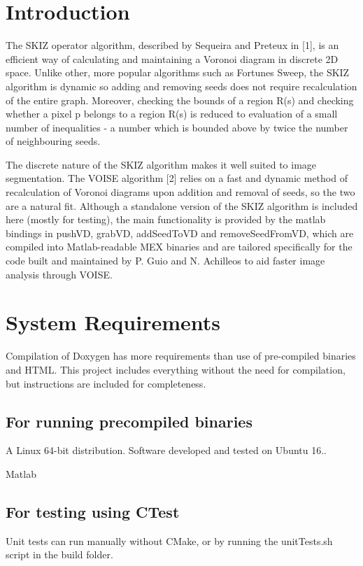 \hypertarget{index_intro_sec}{}\section{Introduction}\label{index_intro_sec}
The S\+K\+IZ operator algorithm, described by Sequeira and Preteux in \mbox{[}1\mbox{]}, is an efficient way of calculating and maintaining a Voronoi diagram in discrete 2D space. Unlike other, more popular algorithms such as Fortune\textquotesingle{}s Sweep, the S\+K\+IZ algorithm is dynamic so adding and removing seeds does not require recalculation of the entire graph. Moreover, checking the bounds of a region R(s) and checking whether a pixel p belongs to a region R(s) is reduced to evaluation of a small number of inequalities -\/ a number which is bounded above by twice the number of neighbouring seeds.

The discrete nature of the S\+K\+IZ algorithm makes it well suited to image segmentation. The V\+O\+I\+SE algorithm \mbox{[}2\mbox{]} relies on a fast and dynamic method of recalculation of Voronoi diagrams upon addition and removal of seeds, so the two are a natural fit. Although a standalone version of the S\+K\+IZ algorithm is included here (mostly for testing), the main functionality is provided by the matlab bindings in push\+VD, grab\+VD, add\+Seed\+To\+VD and remove\+Seed\+From\+VD, which are compiled into Matlab-\/readable M\+EX binaries and are tailored specifically for the code built and maintained by P. Guio and N. Achilleos to aid faster image analysis through V\+O\+I\+SE.\hypertarget{index_req_sec}{}\section{System Requirements}\label{index_req_sec}
Compilation of Doxygen has more requirements than use of pre-\/compiled binaries and H\+T\+ML. This project includes everything without the need for compilation, but instructions are included for completeness.\hypertarget{index_run_sec}{}\subsection{For running precompiled binaries}\label{index_run_sec}

\begin{DoxyItemize}
\item A Linux 64-\/bit distribution. Software developed and tested on Ubuntu 16..
\item Matlab
\end{DoxyItemize}\hypertarget{index_test_sec}{}\subsection{For testing using C\+Test}\label{index_test_sec}
Unit tests can run manually without C\+Make, or by running the {\ttfamily unit\+Tests.\+sh} script in the {\ttfamily build} folder.


